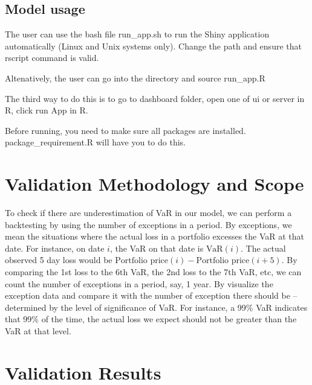 \documentclass[letterpaper,11pt, oneside]{layout}
\begin{document}
\section{Model usage}
\label{sec:md:mu}

The user can use the bash file run\_app.sh to run the Shiny application automatically (Linux and Unix systems only). Change the path and ensure that rscript command is valid.

Altenatively, the user can go into the directory and source run\_app.R

The third way to do this is to go to dashboard folder, open one of ui or server in R, click run App in R.

Before running, you need to make sure all packages are installed. package\_requirement.R will have you to do this.



\begingroup
\renewcommand{\clearpage}{}
\chapter{Validation Methodology and Scope}
\label{chap:vms}
\endgroup

To check if there are underestimation of VaR in our model, we can perform a backtesting by using the number of exceptions in a period. By exceptions, we mean the situations where the actual loss in a portfolio excesses the VaR at that date. For instance, on date $i$, the VaR on that date is $\text{VaR}(i)$. The actual observed 5 day loss would be $\text{Portfolio price}(i) - \text{Portfolio price}(i+5)$. By comparing the 1st loss to the 6th VaR, the 2nd loss to the 7th VaR, etc, we can count the number of exceptions in a period, say, 1 year. By visualize the exception data and compare it with the number of exception there should be -- determined by the level of significance of VaR. For instance, a 99\% VaR indicates that 99\% of the time, the actual loss we expect should not be greater than the VaR at that level. 


\begingroup
\renewcommand{\clearpage}{}
\chapter{Validation Results}
\label{chap:vr}
\endgroup
\end{document}
